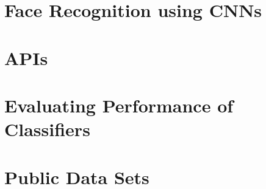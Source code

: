 \section{Face Recognition using CNNs}
\section{APIs}
\section{Evaluating Performance of Classifiers}
\section{Public Data Sets}
